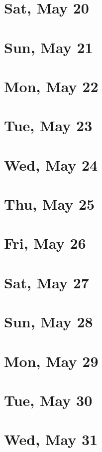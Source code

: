 	\section{Sat, May 20}
		
		
	\section{Sun, May 21}
		
		
	\section{Mon, May 22}
		
		
	\section{Tue, May 23}
		
		
	\section{Wed, May 24}
		
		
	\section{Thu, May 25}
		
		
	\section{Fri, May 26}
		
		
	\section{Sat, May 27}
		
		
	\section{Sun, May 28}
		
		
	\section{Mon, May 29}
		
		
	\section{Tue, May 30}
		
		
	\section{Wed, May 31}
		
		

